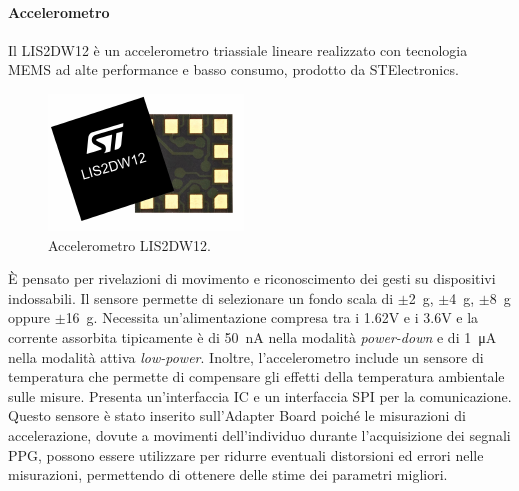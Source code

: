 \paragraph{Accelerometro} Il LIS2DW12 è un accelerometro triassiale lineare realizzato con tecnologia MEMS ad alte performance e basso consumo, prodotto da STElectronics\cite{STElectronicsLIS2DW12}. 
\begin{figure}[b]
	\centering
	\includegraphics[width=0.3\linewidth]{ImageFiles/Hardware/ImmagineLIS2DW12}
	\caption{Accelerometro LIS2DW12.}
	\label{fig:ImmagineLIS2DW12}
\end{figure}
\`E pensato per rivelazioni di movimento e riconoscimento dei gesti su dispositivi indossabili. Il sensore permette di selezionare un fondo scala di $\pm$\SI{2}{\gram}, $\pm$\SI{4}{\gram}, $\pm$\SI{8}{\gram} oppure $\pm$\SI{16}{\gram}. Necessita un'alimentazione compresa tra i 1.62V e i 3.6V e la corrente assorbita tipicamente è di \SI{50}{\nano\ampere} nella modalità \textit{power-down} e di \SI{1}{\micro\ampere} nella modalità attiva \textit{low-power}. Inoltre, l'accelerometro include un sensore di temperatura che permette di compensare gli effetti della temperatura ambientale sulle misure. Presenta un'interfaccia IC e un interfaccia SPI per la comunicazione. Questo sensore è stato inserito sull'Adapter Board poiché le misurazioni di accelerazione, dovute a movimenti dell'individuo durante l'acquisizione dei segnali PPG, possono essere utilizzare per ridurre eventuali distorsioni ed errori nelle misurazioni, permettendo di ottenere delle stime dei parametri migliori.

